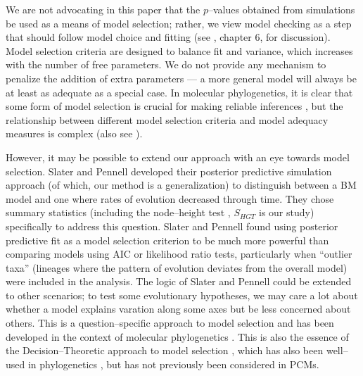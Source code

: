 \documentclass[a4paper,12pt]{article}
\begin{document}
We are not advocating in this paper that the $p$--values obtained from simulations be used as a means of model selection; rather, we view model checking as a step that should follow model choice and fitting (see \citep{Gelmanbook}, chapter 6, for discussion). Model selection criteria are designed to balance fit and variance, which increases with the number of free parameters. We do not provide any mechanism to penalize the addition of extra parameters --- a more general model will always be at least as adequate as a special case. In molecular phylogenetics, it is clear that some form of model selection is crucial for making reliable inferences \citep{SullivanJoyce2005, Ripplinger2008}, but the relationship between different model selection criteria and model adequacy measures is complex \citep{Ripplinger2010} (also see \citep{Boettiger2012}). 

However, it may be possible to extend our approach with an eye towards model selection. Slater and Pennell \citep{SlaterPennell} developed their posterior predictive simulation approach (of which, our method is a generalization) to distinguish between a BM model and one where rates of evolution decreased through time. They chose summary statistics (including the node--height test \citep{FreckletonHarvey2006}, $S_{HGT}$ is our study) specifically to address this question. Slater and Pennell found using posterior predictive fit as a model selection criterion to be much more powerful than comparing models using AIC or likelihood ratio tests, particularly when ``outlier taxa'' (lineages where the pattern of evolution deviates from the overall model) were included in the analysis. The logic of Slater and Pennell could be extended to other scenarios; to test some evolutionary hypotheses, we may care a lot about whether a model explains varation along some axes but be less concerned about others. This is a question--specific approach to model selection and has been developed in the context of molecular phylogenetics \citep{Bollback2002, Lewis2013}. This is also the essence of the Decision--Theoretic approach to model selection \citep{Robert2007}, which has also been well--used in phylogenetics \citep{Minin2003}, but has not previously been considered in PCMs.
\end{document}
